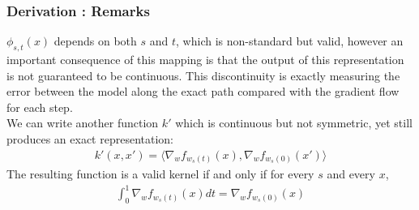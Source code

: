 


\begin{frame}
  \frametitle{Derivation : Remarks}
  $\phi_{s,t}(x)$ depends on both $s$ and $t$, which is non-standard but valid, however an important consequence of this mapping is that the output of this representation is not guaranteed to be continuous. This discontinuity is exactly measuring the error between the model along the exact path compared with the gradient flow for each step. \\

 We can write another function $k'$ which is continuous but not symmetric, yet still produces an exact representation:
 \begin{align}
 k'(x, x') = \langle \nabla_w f_{w_s(t)}(x), \nabla_w f_{w_s(0)}(x')\rangle
 \end{align}
 The resulting function is a valid kernel if and only if for every $s$ and every $x$, 
 \begin{align}
 \label{eq:cond}
     \int_0^1 \nabla_w f_{w_s(t)}(x)dt = \nabla_w f_{w_s(0)}(x)
 \end{align}
\end{frame}

